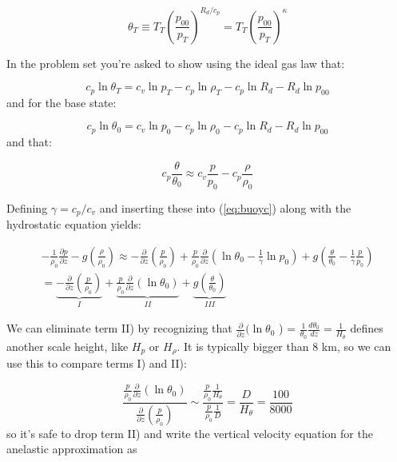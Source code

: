 \documentclass[12pt]{article}
\begin{document}
\begin{equation}
  \label{eq:theta}
  \theta_T \equiv T_T \left ( \frac{p_{00} }{p_T}  \right )^{R_d/c_p} = 
T_T \left ( \frac{p_{00} }{p_T}  \right )^\kappa
\end{equation}


In the problem set you're asked to show using the ideal gas law
that:

\begin{equation}
  \label{eq:ideal}
  c_p \ln \theta_T = c_v \ln p_T - c_p \ln \rho_T - c_p \ln R_d 
- R_d \ln p_{00}
\end{equation}
and for the base state:

\begin{equation}
  \label{eq:ideal2}
  c_p \ln \theta_0 = c_v \ln p_0 - c_p \ln \rho_0 - c_p \ln R_d 
- R_d \ln p_{00}
\end{equation}
and that:

\begin{equation}
  \label{eq:perturbTheta}
  c_p \frac{ \theta}{\theta_0} \approx c_v \frac{ p}{p_0}  - 
c_p \frac{ \rho}{\rho_0} 
\end{equation}

Defining $\gamma=c_p/c_v$ and inserting these into (\ref{eq:buoyc}) along with
the hydrostatic equation yields:

\begin{multline}
  \label{eq:buoyd}
   - \frac{1 }{\rho_0} \frac{ \partial p }{\partial z}  - g \left ( \frac{\rho}{\rho_0} \right )
\approx -\frac{\partial  }{ \partial z} \left ( \frac{ p}{\rho_0} \right )
+ \frac{p }{\rho_0}  \frac{ \partial }{\partial z} 
\left ( \ln \theta_0 - \frac{1}{\gamma} \ln p_0 \right )
+ g \left ( \frac{ \theta}{\theta_0} - \frac{ 1}{\gamma} \frac{p }{p_0} \right ) \\
= \underbrace{-\frac{\partial  }{ \partial z} \left ( \frac{ p}{\rho_0} \right )}_I
+ \underbrace{\frac{p }{\rho_0}  \frac{ \partial }{\partial z} 
\left ( \ln \theta_0  \right )}_{II}
+ \underbrace{g \left ( \frac{ \theta}{\theta_0} \right ) }_{III}
\end{multline}

We can eliminate term II) by recognizing that $\frac{\partial  }{\partial z} 
(\ln \theta_0$ ) = $\frac{1 }{\theta_0}\frac{d \theta_0 }{dz} = \frac{1 }{H_\theta}  $ defines another scale height, like $H_p$ or $H_\rho$. It is typically bigger than 8 km,
so we can use this to compare terms I) and II):


 \begin{equation}
   \label{eq:compare}
\frac{ \frac{p }{\rho_0}  \frac{ \partial }{\partial z} ( \ln \theta_0 )}
{\frac{\partial  }{ \partial z} \left ( \frac{ p}{\rho_0} \right )}
\sim \frac{\frac{p }{\rho_0} \frac{1 }{H_\theta}  }
{\frac{p }{\rho_0} \frac{1 }{D} } = \frac{D}{H_\theta} = \frac{100 }{8000}  
\end{equation}
so it's safe to drop term II) and write the vertical velocity
equation for the anelastic approximation as 
\end{document}
